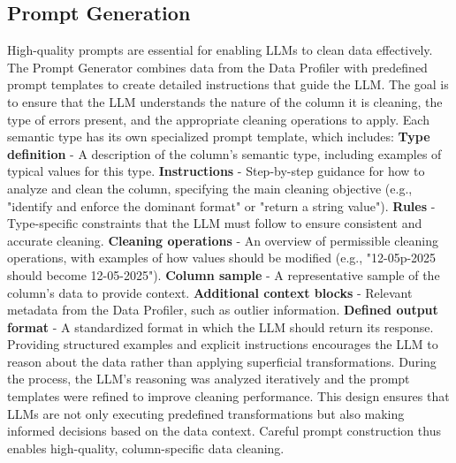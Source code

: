\subsection{Prompt Generation}
High-quality prompts are essential for enabling LLMs to clean data effectively. 
The Prompt Generator combines data from the Data Profiler with predefined prompt templates to create detailed instructions that guide the LLM. 
The goal is to ensure that the LLM understands the nature of the column it is cleaning, the type of errors present, and the appropriate cleaning operations to apply.
\newline\newline
Each semantic type has its own specialized prompt template, which includes:
\newline
\textbf{Type definition} - A description of the column's semantic type, including examples of typical values for this type.
\newline
\textbf{Instructions} - Step-by-step guidance for how to analyze and clean the column, specifying the main cleaning objective (e.g., "identify and enforce the dominant format" or "return a string value").
\newline
\textbf{Rules} - Type-specific constraints that the LLM must follow to ensure consistent and accurate cleaning.
\newline
\textbf{Cleaning operations} - An overview of permissible cleaning operations, with examples of how values should be modified (e.g., "12-05p-2025 should become 12-05-2025").
\newline
\textbf{Column sample} - A representative sample of the column's data to provide context.
\newline
\textbf{Additional context blocks} - Relevant metadata from the Data Profiler, such as outlier information.
\newline
\textbf{Defined output format} - A standardized format in which the LLM should return its response.
\newline\newline
Providing structured examples and explicit instructions encourages the LLM to reason about the data rather than applying superficial transformations.
During the process, the LLM's reasoning was analyzed iteratively and the prompt templates were refined to improve cleaning performance. 
This design ensures that LLMs are not only executing predefined transformations but also making informed decisions based on the data context. 
Careful prompt construction thus enables high-quality, column-specific data cleaning.

